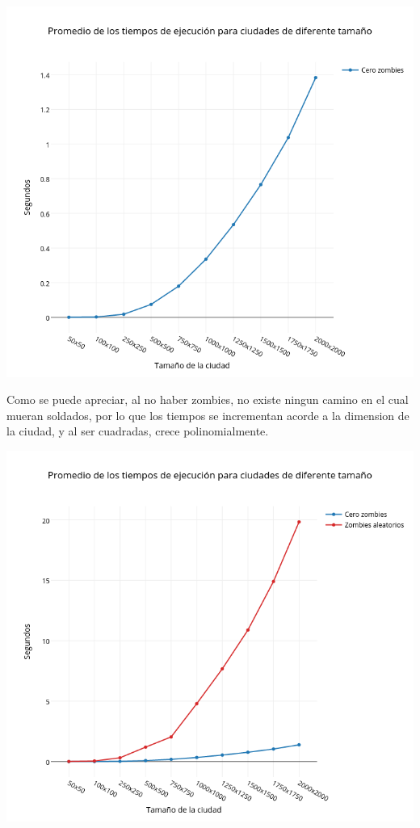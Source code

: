 \includegraphics[width=15cm,keepaspectratio=yes]{imagenes/ej2/czneto.png}

Como se puede apreciar, al no haber zombies, no existe ningun camino en el cual mueran soldados, por lo que los tiempos se incrementan acorde a la dimension de la ciudad, y al ser cuadradas, crece polinomialmente.

\includegraphics[width=15cm,keepaspectratio=yes]{imagenes/ej2/czyza.png}

